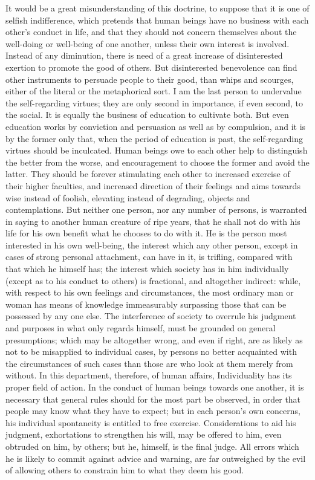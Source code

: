 \documentclass[12pt]{report}
\begin{document}
It would be a great misunderstanding of this doctrine, to suppose that it is one of selfish indifference, which pretends that human beings have no business with each other's conduct in life, and that they should not concern themselves about the well-doing or well-being of one another, unless their own interest is involved. Instead of any diminution, there is need of a great increase of disinterested exertion to promote the good of others. But disinterested benevolence can find other instruments to persuade people to their good, than whips and scourges, either of the literal or the metaphorical sort. I am the last person to undervalue the self-regarding virtues; they are only second in importance, if even second, to the social. It is equally the business of education to cultivate both. But even education works by conviction and persuasion as well as by compulsion, and it is by the former only that, when the period of education is past, the self-regarding virtues should be inculcated. Human beings owe to each other help to distinguish the better from the worse, and encouragement to choose the former and avoid the latter. They should be forever stimulating each other to increased exercise of their higher faculties, and increased direction of their feelings and aims towards wise instead of foolish, elevating instead of degrading, objects and contemplations. But neither one person, nor any number of persons, is warranted in saying to another human creature of ripe years, that he shall not do with his life for his own benefit what he chooses to do with it. He is the person most interested in his own well-being, the interest which any other person, except in cases of strong personal attachment, can have in it, is trifling, compared with that which he himself has; the interest which society has in him individually (except as to his conduct to others) is fractional, and altogether indirect: while, with respect to his own feelings and circumstances, the most ordinary man or woman has means of knowledge immeasurably surpassing those that can be possessed by any one else. The interference of society to overrule his judgment and purposes in what only regards himself, must be grounded on general presumptions; which may be altogether wrong, and even if right, are as likely as not to be misapplied to individual cases, by persons no better acquainted with the circumstances of such cases than those are who look at them merely from without. In this department, therefore, of human affairs, Individuality has its proper field of action. In the conduct of human beings towards one another, it is necessary that general rules should for the most part be observed, in order that people may know what they have to expect; but in each person's own concerns, his individual spontaneity is entitled to free exercise. Considerations to aid his judgment, exhortations to strengthen his will, may be offered to him, even obtruded on him, by others; but he, himself, is the final judge. All errors which he is likely to commit against advice and warning, are far outweighed by the evil of allowing others to constrain him to what they deem his good.
\end{document}
